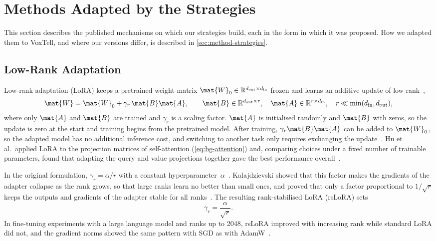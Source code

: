 \section{Methods Adapted by the Strategies}
\label{sec:bg-methods}

This section describes the published mechanisms on which our strategies build, each in the form in which it was proposed.
How we adapted them to VoxTell, and where our versions differ, is described in \cref{sec:method-strategies}.

\subsection{Low-Rank Adaptation}
\label{subsec:bg-lora}

Low-rank adaptation (LoRA) keeps a pretrained weight matrix $\mat{W}_0 \in \mathbb{R}^{d_{\mathrm{out}} \times d_{\mathrm{in}}}$ frozen and learns an additive update of low rank~\cite[Sec.~4.1]{hu2022lora},
\begin{equation}
\mat{W} = \mat{W}_0 + \gamma_r \, \mat{B}\mat{A},
\qquad \mat{B} \in \mathbb{R}^{d_{\mathrm{out}} \times r}, \quad \mat{A} \in \mathbb{R}^{r \times d_{\mathrm{in}}}, \quad r \ll \min(d_{\mathrm{in}}, d_{\mathrm{out}}),
\label{eq:bg-lora}
\end{equation}
where only $\mat{A}$ and $\mat{B}$ are trained and $\gamma_r$ is a scaling factor.
$\mat{A}$ is initialised randomly and $\mat{B}$ with zeros, so the update is zero at the start and training begins from the pretrained model.
After training, $\gamma_r\mat{B}\mat{A}$ can be added to $\mat{W}_0$, so the adapted model has no additional inference cost, and switching to another task only requires exchanging the update~\cite[Sec.~4.1]{hu2022lora}.
Hu et al.\ applied LoRA to the projection matrices of self-attention (\cref{eq:bg-attention}) and, comparing choices under a fixed number of trainable parameters, found that adapting the query and value projections together gave the best performance overall~\cite[Sec.~4.2, 7.1, Table~5]{hu2022lora}.

In the original formulation, $\gamma_r = \alpha / r$ with a constant hyperparameter~$\alpha$~\cite[Sec.~4.1]{hu2022lora}.
Kalajdzievski showed that this factor makes the gradients of the adapter collapse as the rank grows, so that large ranks learn no better than small ones, and proved that only a factor proportional to $1/\sqrt{r}$ keeps the outputs and gradients of the adapter stable for all ranks~\cite[Sec.~2.1, 3]{kalajdzievski2023rankstabilizationscalingfactor}.
The resulting rank-stabilised LoRA (rsLoRA) sets
\begin{equation}
\gamma_r = \frac{\alpha}{\sqrt{r}}.
\label{eq:bg-rslora}
\end{equation}
In fine-tuning experiments with a large language model and ranks up to 2048, rsLoRA improved with increasing rank while standard LoRA did not, and the gradient norms showed the same pattern with SGD as with AdamW~\cite[Sec.~4]{kalajdzievski2023rankstabilizationscalingfactor}.

